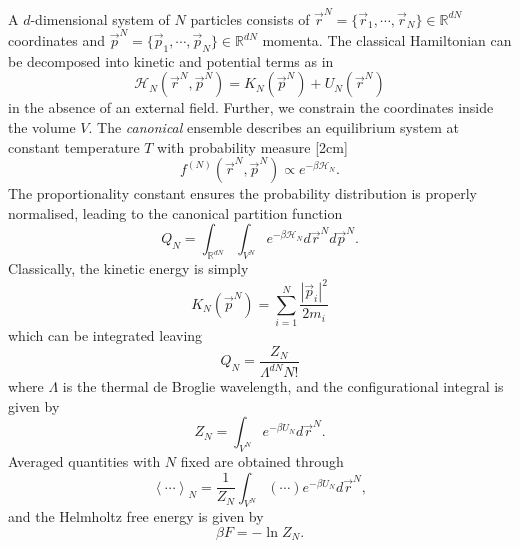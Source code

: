 A $d$-dimensional system of $N$ particles consists of $\vec{r}^N = \{\vec{r}_1, \cdots, \vec{r}_N\} \in \mathbb{R}^{dN}$ coordinates and $\vec{p}^N = \{\vec{p}_1, \cdots, \vec{p}_N\} \in \mathbb{R}^{dN}$ momenta.
The classical Hamiltonian can be decomposed into kinetic and potential terms as in
\begin{equation}
  \mathcal{H}_N(\vec{r}^N, \vec{p}^N)
  =
  K_N(\vec{p}^N) + U_N(\vec{r}^N)
\end{equation}
in the absence of an external field.
Further, we constrain the coordinates inside the volume $V$.
The \emph{canonical} ensemble describes an equilibrium system at constant temperature $T$ with probability measure%
[2cm]
\begin{equation}
  f^{(N)}(\vec{r}^N, \vec{p}^N) \propto e^{-\beta \mathcal{H}_N}.
\end{equation}
The proportionality constant ensures the probability distribution is properly normalised, leading to the canonical partition function
\begin{equation}
  Q_N
  =
  \int_{\mathbb{R}^{dN}} \int_{V^N}
  e^{-\beta\mathcal{H}_N}
  d\vec{r}^N d\vec{p}^N.
\end{equation}
Classically, the kinetic energy is simply
\begin{equation*}
  K_N(\vec{p}^N) = \sum_{i=1}^N \frac{|\vec{p}_i|^2}{2m_i}
\end{equation*}
which can be integrated leaving
\begin{equation}
  Q_N = \frac{Z_N}{\Lambda^{dN} N!}
\end{equation}
where $\Lambda$ is the thermal de Broglie wavelength, and the configurational integral is given by
\begin{equation}\label{eq:canonical-partition}
  Z_N
  =
  \int_{V^N}
  e^{-\beta U_N}
  d\vec{r}^N.
\end{equation}
Averaged quantities with $N$ fixed are obtained through
\begin{equation*}\label{eq:canonical-average}
  \left< \cdots \right>_N
  =
  \frac{1}{Z_N}
  \int_{V^N} \left(\cdots\right) e^{-\beta U_N} d\vec{r}^N,
\end{equation*}
and the Helmholtz free energy is given by
\begin{equation*}
  \beta F = -\ln{Z_N}.
\end{equation*}

